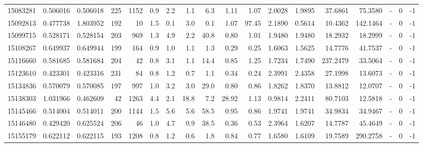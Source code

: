 \begin{tabular}{rrrrrrrrrrrrrrrlrr}
  15083281 & 0.506016 &   0.506018 &  225 & 1152 &      0.9 &      2.2 &     1.1 &      6.3 &       1.11 &        1.07 &  2.0028 &  1.9895 &   37.6861 &   75.3580 &             - &        0 &         -1 \\
  15092813 & 0.477738 &   1.803952 &  192 &   10 &      1.5 &      0.1 &     3.0 &      0.1 &       1.07 &       97.45 &  2.1890 &  0.5614 &   10.4362 &  142.1464 &             - &        0 &         -1 \\
  15099715 & 0.528171 &   0.528154 &  203 &  969 &      1.3 &      4.9 &     2.2 &     40.8 &       0.80 &        1.01 &  1.9480 &  1.9480 &   18.2932 &   18.2999 &             - &        0 &         -1 \\
  15108267 & 0.649937 &   0.649944 &  199 &  164 &      0.9 &      1.0 &     1.1 &      1.3 &       0.29 &        0.25 &  1.6063 &  1.5625 &   14.7776 &   41.7537 &             - &        0 &         -1 \\
  15116660 & 0.581685 &   0.581684 &  204 &   42 &      0.8 &      3.1 &     1.1 &     14.4 &       0.85 &        1.25 &  1.7234 &  1.7490 &  237.2479 &   33.5064 &             - &        0 &         -1 \\
  15123610 & 0.423301 &   0.423316 &  231 &   84 &      0.8 &      1.2 &     0.7 &      1.1 &       0.34 &        0.24 &  2.3991 &  2.4358 &   27.1998 &   13.6073 &             - &        0 &         -1 \\
  15134836 & 0.570079 &   0.570085 &  197 &  997 &      1.0 &      3.2 &     3.0 &     29.0 &       0.80 &        0.86 &  1.8262 &  1.8370 &   13.8812 &   12.0707 &             - &        0 &         -1 \\
  15138303 & 1.031966 &   0.462609 &   42 & 1263 &      4.4 &      2.1 &    18.8 &      7.2 &      28.92 &        1.13 &  0.9814 &  2.2411 &   80.7103 &   12.5818 &             - &        0 &         -1 \\
  15145466 & 0.514004 &   0.514011 &  200 & 1144 &      1.5 &      5.6 &     5.6 &     58.5 &       0.95 &        0.86 &  1.9741 &  1.9741 &   34.9834 &   34.9467 &             - &        0 &         -1 \\
  15146480 & 0.429420 &   0.625524 &  206 &   46 &      1.0 &      4.7 &     0.9 &     38.5 &       0.36 &        0.53 &  2.3964 &  1.6207 &   14.7787 &   45.4649 &             - &        0 &         -1 \\
  15155179 & 0.622112 &   0.622115 &  193 & 1208 &      0.8 &      1.2 &     0.6 &      1.8 &       0.84 &        0.77 &  1.6580 &  1.6109 &   19.7589 &  290.2758 &             - &        0 &         -1 \\

\end{tabular}
